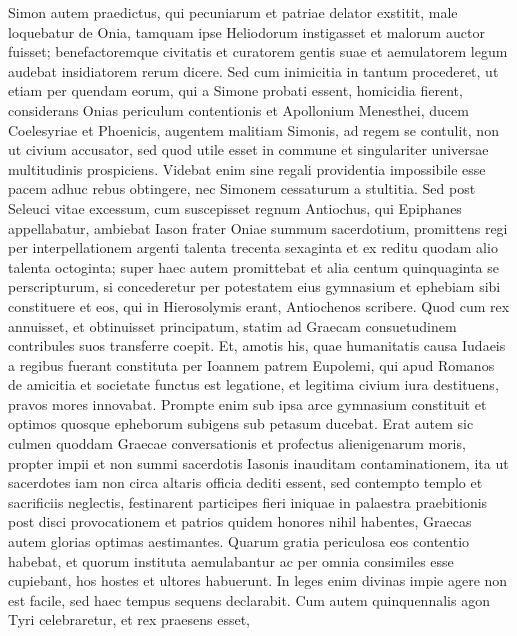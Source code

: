 \begin{biblechapter}
\begin{biblechapter}
\begin{biblechapter}
\begin{biblechapter}
\verse Simon autem praedictus, qui pecuniarum et patriae delator exstitit, male loquebatur de Onia, tamquam ipse Heliodorum instigasset et malorum auctor fuisset; 
\verse benefactoremque civitatis et curatorem gentis suae et aemulatorem legum audebat insidiatorem rerum dicere. 
\verse Sed cum inimicitia in tantum procederet, ut etiam per quendam eorum, qui a Simone probati essent, homicidia fierent, 
\verse considerans Onias periculum contentionis et Apollonium Menesthei, ducem Coelesyriae et Phoenicis, augentem malitiam Simonis, 
\verse ad regem se contulit, non ut civium accusator, sed quod utile esset in commune et singulariter universae multitudinis prospiciens. 
\verse Videbat enim sine regali providentia impossibile esse pacem adhuc rebus obtingere, nec Simonem cessaturum a stultitia.
 \verse Sed post Seleuci vitae excessum, cum suscepisset regnum Antiochus, qui Epiphanes appellabatur, ambiebat Iason frater Oniae summum sacerdotium, 
\verse promittens regi per interpellationem argenti talenta trecenta sexaginta et ex reditu quodam alio talenta octoginta; 
\verse super haec autem promittebat et alia centum quinquaginta se perscripturum, si concederetur per potestatem eius gymnasium et ephebiam sibi constituere et eos, qui in Hierosolymis erant, Antiochenos scribere. 
\verse Quod cum rex annuisset, et obtinuisset principatum, statim ad Graecam consuetudinem contribules suos transferre coepit. 
\verse Et, amotis his, quae humanitatis causa Iudaeis a regibus fuerant constituta per Ioannem patrem Eupolemi, qui apud Romanos de amicitia et societate functus est legatione, et legitima civium iura destituens, pravos mores innovabat. 
\verse Prompte enim sub ipsa arce gymnasium constituit et optimos quosque epheborum subigens sub petasum ducebat. 
\verse Erat autem sic culmen quoddam Graecae conversationis et profectus alienigenarum moris, propter impii et non summi sacerdotis Iasonis inauditam contaminationem, 
\verse ita ut sacerdotes iam non circa altaris officia dediti essent, sed contempto templo et sacrificiis neglectis, festinarent participes fieri iniquae in palaestra praebitionis post disci provocationem 
\verse et patrios quidem honores nihil habentes, Graecas autem glorias optimas aestimantes. 
\verse Quarum gratia periculosa eos contentio habebat, et quorum instituta aemulabantur ac per omnia consimiles esse cupiebant, hos hostes et ultores habuerunt. 
\verse In leges enim divinas impie agere non est facile, sed haec tempus sequens declarabit.
 \verse Cum autem quinquennalis agon Tyri celebraretur, et rex praesens esset, 

\end{biblechapter}
\end{biblechapter}
\end{biblechapter}
\end{biblechapter}
